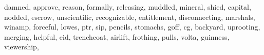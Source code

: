 \documentclass[
  12pt,
]{book}
\newenvironment{Shaded}{\begin{snugshade}}{\end{snugshade}}
\newcommand{\NormalTok}[1]{#1}
\newcommand{\StringTok}[1]{\textcolor[rgb]{0.31,0.60,0.02}{#1}}
\begin{document}
\begin{Shaded}
\begin{Highlighting}[]
                \StringTok{\textquotesingle{}damned\textquotesingle{}}\NormalTok{, }\StringTok{\textquotesingle{}approve\textquotesingle{}}\NormalTok{, }\StringTok{\textquotesingle{}reason\textquotesingle{}}\NormalTok{, }\StringTok{\textquotesingle{}formally\textquotesingle{}}\NormalTok{, }\StringTok{\textquotesingle{}releasing\textquotesingle{}}\NormalTok{, }\StringTok{\textquotesingle{}muddled\textquotesingle{}}\NormalTok{,}
                \StringTok{\textquotesingle{}mineral\textquotesingle{}}\NormalTok{, }\StringTok{\textquotesingle{}shied\textquotesingle{}}\NormalTok{, }\StringTok{\textquotesingle{}capital\textquotesingle{}}\NormalTok{, }\StringTok{\textquotesingle{}nodded\textquotesingle{}}\NormalTok{, }\StringTok{\textquotesingle{}escrow\textquotesingle{}}\NormalTok{, }\StringTok{\textquotesingle{}unscientific\textquotesingle{}}\NormalTok{,}
                \StringTok{\textquotesingle{}recognizable\textquotesingle{}}\NormalTok{, }\StringTok{\textquotesingle{}entitlement\textquotesingle{}}\NormalTok{, }\StringTok{\textquotesingle{}disconnecting\textquotesingle{}}\NormalTok{, }\StringTok{\textquotesingle{}marshals\textquotesingle{}}\NormalTok{,}
                \StringTok{\textquotesingle{}winamp\textquotesingle{}}\NormalTok{, }\StringTok{\textquotesingle{}forceful\textquotesingle{}}\NormalTok{, }\StringTok{\textquotesingle{}lowes\textquotesingle{}}\NormalTok{, }\StringTok{\textquotesingle{}ptr\textquotesingle{}}\NormalTok{, }\StringTok{\textquotesingle{}sip\textquotesingle{}}\NormalTok{, }\StringTok{\textquotesingle{}pencils\textquotesingle{}}\NormalTok{, }\StringTok{\textquotesingle{}stomachs\textquotesingle{}}\NormalTok{,}
                \StringTok{\textquotesingle{}goff\textquotesingle{}}\NormalTok{, }\StringTok{\textquotesingle{}cg\textquotesingle{}}\NormalTok{, }\StringTok{\textquotesingle{}backyard\textquotesingle{}}\NormalTok{, }\StringTok{\textquotesingle{}uprooting\textquotesingle{}}\NormalTok{, }\StringTok{\textquotesingle{}merging\textquotesingle{}}\NormalTok{,}
                \StringTok{\textquotesingle{}helpful\textquotesingle{}}\NormalTok{, }\StringTok{\textquotesingle{}eid\textquotesingle{}}\NormalTok{, }\StringTok{\textquotesingle{}trenchcoat\textquotesingle{}}\NormalTok{, }\StringTok{\textquotesingle{}airlift\textquotesingle{}}\NormalTok{, }\StringTok{\textquotesingle{}frothing\textquotesingle{}}\NormalTok{,}
                \StringTok{\textquotesingle{}pulls\textquotesingle{}}\NormalTok{, }\StringTok{\textquotesingle{}volta\textquotesingle{}}\NormalTok{, }\StringTok{\textquotesingle{}guinness\textquotesingle{}}\NormalTok{, }\StringTok{\textquotesingle{}viewership\textquotesingle{}}\NormalTok{,}

\end{Highlighting}
\end{Shaded}
\end{document}
